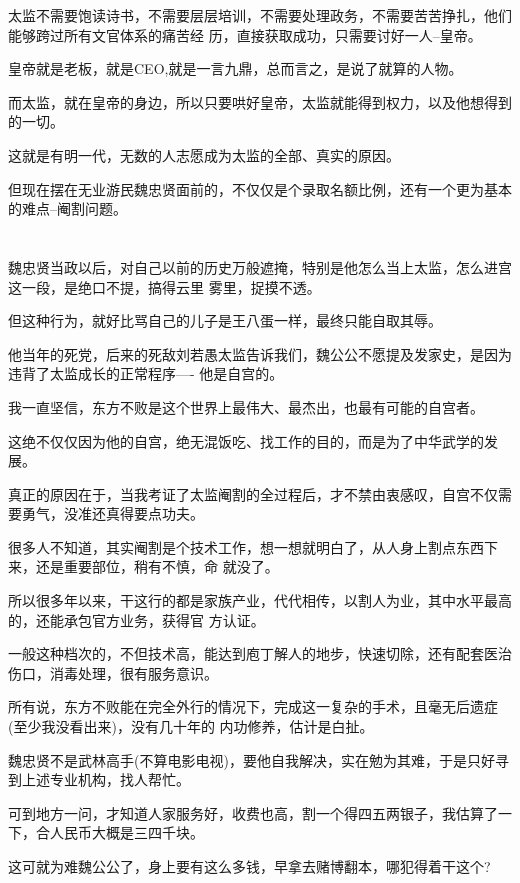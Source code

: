 \documentclass[11pt,a4paper,onecolumn]{article}
\begin{document}
太监不需要饱读诗书，不需要层层培训，不需要处理政务，不需要苦苦挣扎，他们能够跨过所有文官体系的痛苦经
历，直接获取成功，只需要讨好一人--皇帝。

皇帝就是老板，就是CEO,就是一言九鼎，总而言之，是说了就算的人物。

而太监，就在皇帝的身边，所以只要哄好皇帝，太监就能得到权力，以及他想得到的一切。

这就是有明一代，无数的人志愿成为太监的全部、真实的原因。

但现在摆在无业游民魏忠贤面前的，不仅仅是个录取名额比例，还有一个更为基本的难点--阉割问题。

\section[\thesection]{}

魏忠贤当政以后，对自己以前的历史万般遮掩，特别是他怎么当上太监，怎么进宫这一段，是绝口不提，搞得云里
雾里，捉摸不透。

但这种行为，就好比骂自己的儿子是王八蛋一样，最终只能自取其辱。

他当年的死党，后来的死敌刘若愚太监告诉我们，魏公公不愿提及发家史，是因为违背了太监成长的正常程序----
他是自宫的。

我一直坚信，东方不败是这个世界上最伟大、最杰出，也最有可能的自宫者。

这绝不仅仅因为他的自宫，绝无混饭吃、找工作的目的，而是为了中华武学的发展。

真正的原因在于，当我考证了太监阉割的全过程后，才不禁由衷感叹，自宫不仅需要勇气，没准还真得要点功夫。

很多人不知道，其实阉割是个技术工作，想一想就明白了，从人身上割点东西下来，还是重要部位，稍有不慎，命
就没了。

所以很多年以来，干这行的都是家族产业，代代相传，以割人为业，其中水平最高的，还能承包官方业务，获得官
方认证。

一般这种档次的，不但技术高，能达到庖丁解人的地步，快速切除，还有配套医治伤口，消毒处理，很有服务意识。

所有说，东方不败能在完全外行的情况下，完成这一复杂的手术，且毫无后遗症(至少我没看出来)，没有几十年的
内功修养，估计是白扯。

魏忠贤不是武林高手(不算电影电视)，要他自我解决，实在勉为其难，于是只好寻到上述专业机构，找人帮忙。

可到地方一问，才知道人家服务好，收费也高，割一个得四五两银子，我估算了一下，合人民币大概是三四千块。

这可就为难魏公公了，身上要有这么多钱，早拿去赌博翻本，哪犯得着干这个?
\end{document}
